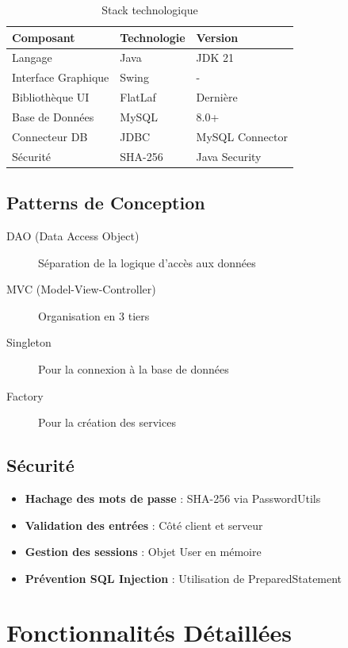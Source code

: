\documentclass[12pt,a4paper]{report}
\begin{document}
\begin{table}[h]
\centering
\begin{tabular}{|l|l|l|}
\hline
\textbf{Composant} & \textbf{Technologie} & \textbf{Version} \\
\hline
Langage & Java & JDK 21 \\
Interface Graphique & Swing & - \\
Bibliothèque UI & FlatLaf & Dernière \\
Base de Données & MySQL & 8.0+ \\
Connecteur DB & JDBC & MySQL Connector \\
Sécurité & SHA-256 & Java Security \\
\hline
\end{tabular}
\caption{Stack technologique}
\end{table}

\section{Patterns de Conception}

\begin{description}
    \item[DAO (Data Access Object)] Séparation de la logique d'accès aux données
    \item[MVC (Model-View-Controller)] Organisation en 3 tiers
    \item[Singleton] Pour la connexion à la base de données
    \item[Factory] Pour la création des services
\end{description}

\section{Sécurité}

\begin{itemize}
    \item \textbf{Hachage des mots de passe} : SHA-256 via PasswordUtils
    \item \textbf{Validation des entrées} : Côté client et serveur
    \item \textbf{Gestion des sessions} : Objet User en mémoire
    \item \textbf{Prévention SQL Injection} : Utilisation de PreparedStatement
\end{itemize}

\chapter{Fonctionnalités Détaillées}
\end{document}
